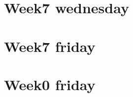 
\section*{Week7 wednesday}

\vfill
\section*{Week7 friday}

\vfill
\section*{Week0 friday}

\vfill
